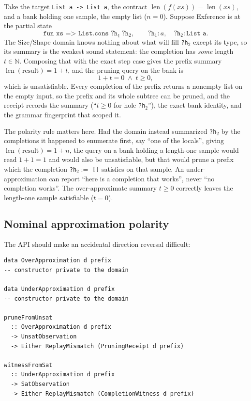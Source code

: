 \documentclass[11pt,oneside]{report}
\newcommand{\Nat}{\mathbb{N}}
\newcommand{\code}[1]{\texttt{#1}}
\begin{document}
Take the target \code{List a -> List a}, the contract $\operatorname{len}(f(xs))=\operatorname{len}(xs)$, and a bank holding one sample, the empty list ($n=0$). Suppose Exference is at the partial state
\[
  \code{fun xs => List.cons ?h}_1\ \code{?h}_2,
  \qquad \code{?h}_1 : a,\quad \code{?h}_2 : \code{List a}.
\]
The Size/Shape domain knows nothing about what will fill \code{?h}$_2$ except its type, so its summary is the weakest sound statement: the completion has \emph{some} length $t\in\Nat$. Composing that with the exact step case gives the prefix summary $\operatorname{len}(\text{result}) = 1 + t$, and the pruning query on the bank is
\[
  1 + t = 0 \;\land\; t \ge 0,
\]
which is unsatisfiable. Every completion of the prefix returns a nonempty list on the empty input, so the prefix and its whole subtree can be pruned, and the receipt records the summary (``$t\ge 0$ for hole \code{?h}$_2$''), the exact bank identity, and the grammar fingerprint that scoped it.

The polarity rule matters here. Had the domain instead summarized \code{?h}$_2$ by the completions it happened to enumerate first, say ``one of the locals'', giving $\operatorname{len}(\text{result})=1+n$, the query on a bank holding a length-one sample would read $1+1=1$ and would also be unsatisfiable, but that would prune a prefix which the completion \code{?h}$_2 :=$ \code{[]} satisfies on that sample. An under-approximation can report ``here is a completion that works'', never ``no completion works''. The over-approximate summary $t\ge0$ correctly leaves the length-one sample satisfiable ($t=0$).

\subsection{Nominal approximation polarity}

The API should make an accidental direction reversal difficult:

\begin{lstlisting}[language=HaskellX,caption={Nominal distinction between completion approximations.}]
data OverApproximation d prefix
-- constructor private to the domain

data UnderApproximation d prefix
-- constructor private to the domain

pruneFromUnsat
  :: OverApproximation d prefix
  -> UnsatObservation
  -> Either ReplayMismatch (PruningReceipt d prefix)

witnessFromSat
  :: UnderApproximation d prefix
  -> SatObservation
  -> Either ReplayMismatch (CompletionWitness d prefix)
\end{lstlisting}
\end{document}
